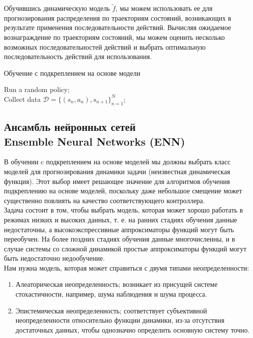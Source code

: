 \documentclass[a4paper,12pt]{article}
\begin{document}
Обучившись динамическую модель $\tilde{f}$, мы можем использовать ее для прогнозирования распределения по траекториям состояний, возникающих в результате применения последовательности действий. Вычисляя ожидаемое вознаграждение по траекториям состояний, мы можем оценить несколько возможных последовательностей действий и выбрать оптимальную последовательность действий для использования.\\

\begin{algorithm}[H]
\SetAlgoLined
\DontPrintSemicolon
\caption{Обучение с подкреплением на основе модели}
Run a random policy;\\
Collect data $\mathcal{D}=\{(s_n,a_n), s_{n+1}\}_{n=1}^N$;\\
\end{algorithm}

\subsection{Ансамбль нейронных сетей\\
Ensemble Neural Networks (ENN)}
В обучении c подкреплением на основе моделей мы должны выбрать класс моделей для прогнозирования динамики задачи (неизвестная динамическая функция). Этот выбор имеет решающее значение для алгоритмов обучения подкреплению на основе моделей, поскольку даже небольшое смещение может существенно повлиять на качество соответствующего контроллера.\\

Задача состоит в том, чтобы выбрать модель, которая может хорошо работать в режимах низких и высоких данных, т. е. на ранних стадиях обучения данные недостаточны, а высокоэкспрессивные аппроксиматоры функций могут быть переобучен. На более поздних стадиях обучения данные многочисленны, и в случае системы со сложной динамикой простые аппроксиматоры функций могут быть недостаточно недообучение.\\
\newpage
Нам нужна модель, которая может справиться с двумя типами неопределенности:
\begin{enumerate}
    \item Алеаторическая неопределенность; возникает из присущей системе стохастичности, например, шума наблюдения и шума процесса.
\item Эпистемическая неопределенность; соответствует субъективной неопределенности относительно функции динамики, из-за отсутствия достаточных данных, чтобы однозначно определить основную систему точно.
\end{enumerate}
\end{document}
